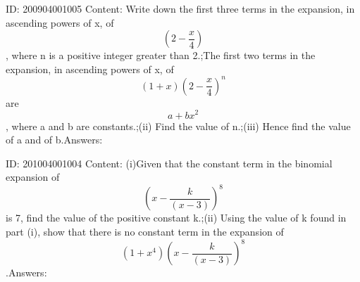 \documentclass{article}
\begin{document}
ID: 200904001005
Content:
Write down the first three terms in the expansion, in ascending powers of x, of $$(2-\frac{x}{4})$$, where n is a positive integer greater than 2.;The first two terms in the expansion, in ascending powers of x, of $$(1+x)(2-\frac{x}{4})^n$$ are $$a+bx^2$$, where a and b are constants.;(ii) Find the value of n.;(iii) Hence find the value of a and of b.Answers:

ID: 201004001004
Content:
(i)Given that the constant term in the binomial expansion of $$(x-\frac{k}{(x-3)})^8$$ is 7, find the value of the positive constant k.;(ii) Using the value of k found in part (i), show that there is no constant term in the expansion of $$(1+x^4)(x-\frac{k}{(x-3)})^8$$.Answers:
\end{document}
